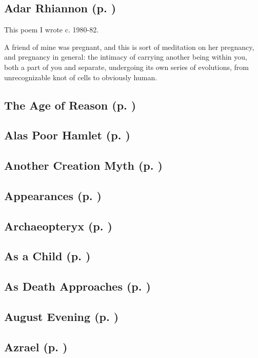 \subsection*{Adar Rhiannon (p. \pageref{ch:adar_rhiannon})}
This poem I wrote c. 1980-82.

A friend of mine was pregnant, and this is sort of meditation on her
pregnancy, and pregnancy in general: the intimacy of carrying another
being within you, both a part of you and separate, undergoing its own
series of evolutions, from unrecognizable knot of cells to obviously
human.

\subsection*{The Age of Reason (p. \pageref{ch:age_of_reason})}
\subsection*{Alas Poor Hamlet (p. \pageref{ch:alas_poor_hamlet})}
\subsection*{Another Creation Myth (p. \pageref{ch:another_creation_myth})}
\subsection*{Appearances (p. \pageref{ch:appearances})}
\subsection*{Archaeopteryx (p. \pageref{ch:archaeopteryx})}
\subsection*{As a Child (p. \pageref{ch:as_a_child})}
\subsection*{As Death Approaches (p. \pageref{ch:as_death_approaches})}
\subsection*{August Evening (p. \pageref{ch:august_evening})}
\subsection*{Azrael (p. \pageref{ch:azrael})}
